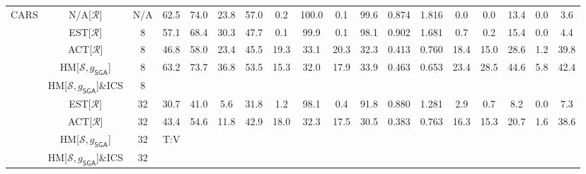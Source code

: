 \begin{table*}
{\begin{tabular}{c|cc|cccc|ccccc|ccccc|c}
	\midrule

\multirow{9}{*}{CARS} & N/A{[}$\mathcal{R}${]} & N/A & 62.5 & 74.0 & 23.8 & 57.0 & 0.2 & 100.0 & 0.1 & 99.6 & 0.874 & 1.816 & 0.0 & 0.0 & 13.4 & 0.0 & 3.6\tabularnewline
\cline{2-18} \cline{3-18} \cline{4-18} \cline{5-18} \cline{6-18} \cline{7-18} \cline{8-18} \cline{9-18} \cline{10-18} \cline{11-18} \cline{12-18} \cline{13-18} \cline{14-18} \cline{15-18} \cline{16-18} \cline{17-18} \cline{18-18}
 & EST{[}$\mathcal{R}${]} & 8 & 57.1 & 68.4 & 30.3 & 47.7 & 0.1 & 99.9 & 0.1 & 98.1 & 0.902 & 1.681 & 0.7 & 0.2 & 15.4 & 0.0 & 4.4\tabularnewline
 & ACT{[}$\mathcal{R}${]} & 8 & 46.8 & 58.0 & 23.4 & 45.5 & 19.3 & 33.1 & 20.3 & 32.3 & 0.413 & 0.760 & 18.4 & 15.0 & 28.6 & 1.2 & 39.8\tabularnewline
 & HM{[}$\mathcal{S},g_{\mathsf{SGA}}${]} & 8 & 63.2 & 73.7 & 36.8 & 53.5 & 15.3 & 32.0 & 17.9 & 33.9 & 0.463 & 0.653 & 23.4 & 28.5 & 44.6 & 5.8 & 42.4\tabularnewline
 & HM{[}$\mathcal{S},g_{\mathsf{SGA}}${]}\&ICS & 8 &  &  &  &  &  &  &  &  &  &  &  &  &  &  & \tabularnewline
\cline{2-18} \cline{3-18} \cline{4-18} \cline{5-18} \cline{6-18} \cline{7-18} \cline{8-18} \cline{9-18} \cline{10-18} \cline{11-18} \cline{12-18} \cline{13-18} \cline{14-18} \cline{15-18} \cline{16-18} \cline{17-18} \cline{18-18}
 & EST{[}$\mathcal{R}${]} & 32 & 30.7 & 41.0 & 5.6 & 31.8 & 1.2 & 98.1 & 0.4 & 91.8 & 0.880 & 1.281 & 2.9 & 0.7 & 8.2 & 0.0 & 7.3\tabularnewline
 & ACT{[}$\mathcal{R}${]} & 32 & 43.4 & 54.6 & 11.8 & 42.9 & 18.0 & 32.3 & 17.5 & 30.5 & 0.383 & 0.763 & 16.3 & 15.3 & 20.7 & 1.6 & 38.6\tabularnewline
 & HM{[}$\mathcal{S},g_{\mathsf{SGA}}${]} & 32 & T:V &  &  &  &  &  &  &  &  &  &  &  &  &  & \tabularnewline
 & HM{[}$\mathcal{S},g_{\mathsf{SGA}}${]}\&ICS & 32 &  &  &  &  &  &  &  &  &  &  &  &  &  &  & \tabularnewline

	\midrule


\end{tabular}}
\end{table*}
